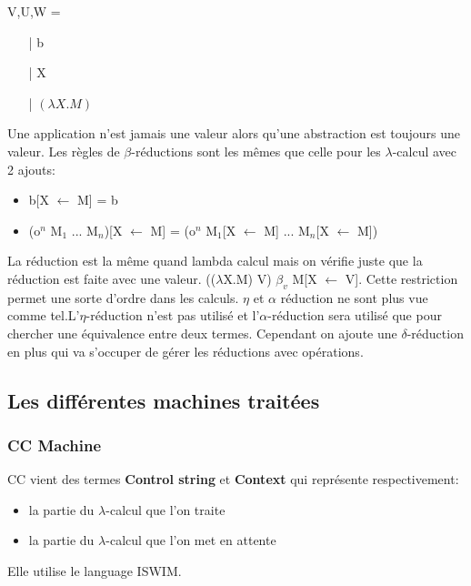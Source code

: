 \documentclass[10pt,a4paper]{article}
\begin{document}
				V,U,W =
				\begin{itemize}
					\item[|] b
					\item[|] X
					\item[|] $(\lambda X.M)$
				\end{itemize}
				
				
				Une application n'est jamais une valeur alors qu'une abstraction est toujours une valeur.
				\medbreak
				Les règles de $\beta$-réductions sont les mêmes que celle pour les $\lambda$-calcul avec 2 ajouts:
				\begin{itemize}
					\item b[X $\longleftarrow$ M] = b
					\item (o$^{n}$ M$_{1}$ ... M$_{n}$)[X $\longleftarrow$ M] = (o$^{n}$ M$_{1}$[X $\longleftarrow$ M] ... M$_{n}$[X $\longleftarrow$ M])
				\end{itemize}
				
				La réduction est la même quand lambda calcul mais on vérifie juste que la réduction est faite avec une valeur. (($\lambda$X.M) V) $\beta_{v}$ M[X $\longleftarrow$ V]. Cette restriction permet une sorte d'ordre dans les calculs.
				\smallbreak
				$\eta$ et $\alpha$ réduction ne sont plus vue comme tel.L'$\eta$-réduction n'est pas utilisé et l'$\alpha$-réduction sera utilisé que pour chercher une équivalence entre deux termes.
				\medbreak
				Cependant on ajoute une $\delta$-réduction en plus qui va s'occuper de gérer les réductions avec opérations.
				\bigbreak
				\newpage
			\subsection{Les différentes machines traitées}\label{Machine}
				\subsubsection{CC Machine}
					
					CC vient des termes \textbf{Control string} et \textbf{Context} qui représente respectivement:
					\begin{itemize}
						\item la partie du $\lambda$-calcul que l'on traite
						\item la partie du $\lambda$-calcul que l'on met en attente 
					\end{itemize}
					Elle utilise le language ISWIM.
					\bigbreak
				
\end{document}
